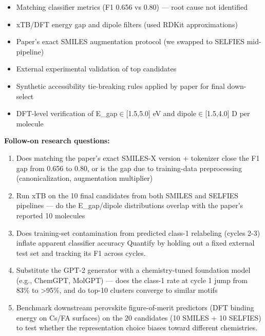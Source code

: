 \begin{itemize}[leftmargin=1.4em,itemsep=0.2em,topsep=0.2em]
\item Matching classifier metrics (F1 0.656 vs 0.80) --- root cause not identified
\item xTB/DFT energy gap and dipole filters (used RDKit approximations)
\item Paper's exact SMILES augmentation protocol (we swapped to SELFIES mid-pipeline)
\item External experimental validation of top candidates
\item Synthetic accessibility tie-breaking rules applied by paper for final down-select
\item DFT-level verification of E\_gap$\in$[1.5,5.0] eV and dipole$\in$[1.5,4.0] D per molecule
\end{itemize}\noindent\textbf{Follow-on research questions:}
\begin{enumerate}[leftmargin=1.6em,itemsep=0.2em,topsep=0.2em,label=Q\arabic*.]
\item Does matching the paper's exact SMILES-X version + tokenizer close the F1 gap from 0.656 to 0.80, or is the gap due to training-data preprocessing (canonicalization, augmentation multiplier)
\item Run xTB on the 10 final candidates from both SMILES and SELFIES pipelines --- do the E\_gap/dipole distributions overlap with the paper's reported 10 molecules
\item Does training-set contamination from predicted class-1 relabeling (cycles 2-3) inflate apparent classifier accuracy Quantify by holding out a fixed external test set and tracking its F1 across cycles.
\item Substitute the GPT-2 generator with a chemistry-tuned foundation model (e.g., ChemGPT, MolGPT) --- does the class-1 rate at cycle 1 jump from 83\% to \textgreater{}95\%, and do top-10 clusters converge to similar motifs
\item Benchmark downstream perovskite figure-of-merit predictors (DFT binding energy on Cs/FA surfaces) on the 20 candidates (10 SMILES + 10 SELFIES) to test whether the representation choice biases toward different chemistries.
\end{enumerate}

